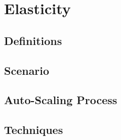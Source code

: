 \chapter{Elasticity}
\label{chp:elasticity}


\lipsum[1]


\section{Definitions}
\label{sec:elasticity-definitions}

\lipsum[1]


\section{Scenario}
\label{sec:elasticity-scenario}

\lipsum[1]


\section{Auto-Scaling Process}
\label{sec:elasticity-auto-scaling-process}

\lipsum[1]


\section{Techniques}
\label{sec:elasticity-techniques}

\lipsum[1]